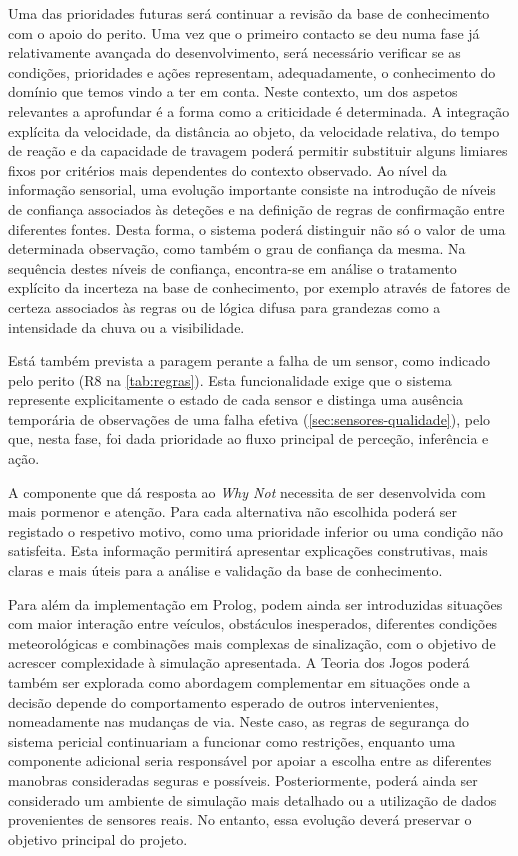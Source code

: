 Uma das prioridades futuras será continuar a revisão da base de conhecimento
com o apoio do perito. Uma vez que o primeiro contacto se deu numa fase já
relativamente avançada do desenvolvimento, será necessário verificar se as
condições, prioridades e ações representam, adequadamente, o conhecimento do
domínio que temos vindo a ter em conta. Neste contexto, um dos aspetos
relevantes a aprofundar é a forma como a criticidade é determinada. A
integração explícita da velocidade, da distância ao objeto, da velocidade
relativa, do tempo de reação e da capacidade de travagem poderá permitir
substituir alguns limiares fixos por critérios mais dependentes do contexto
observado. Ao nível da informação sensorial, uma evolução importante consiste
na introdução de níveis de confiança associados às deteções e na definição de
regras de confirmação entre diferentes fontes. Desta forma, o sistema poderá
distinguir não só o valor de uma determinada observação, como também o grau
de confiança da mesma. Na sequência destes níveis de confiança, encontra-se
em análise o tratamento explícito da incerteza na base de conhecimento, por
exemplo através de fatores de certeza associados às regras ou de lógica
difusa para grandezas como a intensidade da chuva ou a visibilidade.

Está também prevista a paragem perante a falha de um sensor, como indicado
pelo perito (R8 na \cref{tab:regras}). Esta funcionalidade exige que o
sistema represente explicitamente o estado de cada sensor e distinga uma
ausência temporária de observações de uma falha efetiva
(\cref{sec:sensores-qualidade}), pelo que, nesta fase, foi dada prioridade ao
fluxo principal de perceção, inferência e ação.

A componente que dá resposta ao \emph{Why Not} necessita de ser desenvolvida
com mais pormenor e atenção. Para cada alternativa não escolhida poderá ser
registado o respetivo motivo, como uma prioridade inferior ou uma condição não
satisfeita. Esta informação permitirá apresentar explicações construtivas,
mais claras e mais úteis para a análise e validação da base de conhecimento.

Para além da implementação em Prolog, podem ainda ser introduzidas situações
com maior interação entre veículos, obstáculos inesperados, diferentes
condições meteorológicas e combinações mais complexas de sinalização, com o
objetivo de acrescer complexidade à simulação apresentada. A Teoria dos Jogos
poderá também ser explorada como abordagem complementar em situações onde a
decisão depende do comportamento esperado de outros intervenientes,
nomeadamente nas mudanças de via. Neste caso, as regras de segurança do
sistema pericial continuariam a funcionar como restrições, enquanto uma
componente adicional seria responsável por apoiar a escolha entre as
diferentes manobras consideradas seguras e possíveis. Posteriormente, poderá
ainda ser considerado um ambiente de simulação mais detalhado ou a utilização
de dados provenientes de sensores reais. No entanto, essa evolução deverá
preservar o objetivo principal do projeto.

